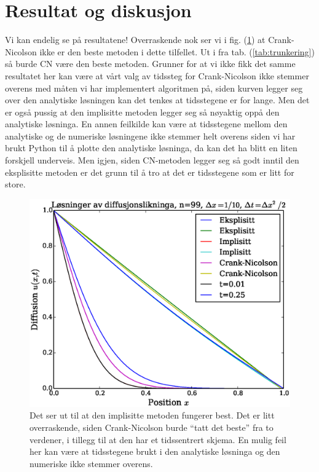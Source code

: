 \documentclass[norsk, 10pt]{article}
\begin{document}
\section*{Resultat og diskusjon}
Vi kan endelig se på resultatene! Overraskende nok ser vi i fig. (\ref{fig:analnum}) at Crank-Nicolson ikke er den beste metoden i dette tilfellet. Ut i fra tab. (\ref{tab:trunkering}) så burde CN være den beste metoden. Grunner for at vi ikke fikk det samme resultatet her kan være at vårt valg av tidssteg for Crank-Nicolson ikke stemmer overens med måten vi har implementert algoritmen på, siden kurven legger seg over den analytiske løsningen kan det tenkes at tidsstegene er for lange. Men det er også pussig at den implisitte metoden legger seg så nøyaktig oppå den analytiske løsninga. En annen feilkilde kan være at tidsstegene mellom den analytiske og de numeriske løsningene ikke stemmer helt overens siden vi har brukt Python til å plotte den analytiske løsninga, da kan det ha blitt en liten forskjell underveis. Men igjen, siden CN-metoden legger seg så godt inntil den eksplisitte metoden er det grunn til å tro at det er tidsstegene som er litt for store.
\begin{figure}[H]
\centerline{\includegraphics[scale = 0.5]{oppgave_d.eps}}
\caption{Det ser ut til at den implisitte metoden fungerer best. Det er litt overraskende, siden Crank-Nicolson burde ``tatt det beste'' fra to verdener, i tillegg til at den har et tidssentrert skjema. En mulig feil her kan være at tidsstegene brukt i den analytiske løsninga og den numeriske ikke stemmer overens.}
\label{fig:analnum}
\end{figure}
\end{document}
